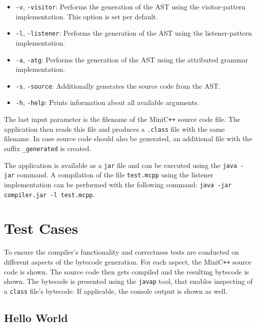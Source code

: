 \begin{itemize}
    \item \verb|-v|, \verb|-visitor|: Performs the generation of the AST using the visitor-pattern implementation. This option is set per default.
    \item \verb|-l|, \verb|-listener|: Performs the generation of the AST using the listener-pattern implementation.
    \item \verb|-a|, \verb|-atg|: Performs the generation of the AST using the attributed grammar implementation.
    \item \verb|-s|, \verb|-source|: Additionally generates the source code from the AST. 
    \item \verb|-h|, \verb|-help|: Prints information about all available arguments.
\end{itemize}

The last input parameter is the filename of the MiniC\verb|++| source code file. The application then reads this file and produces a \verb|.class| file with the same filename. In case source code should also be generated, an additional file with the suffix \verb|_generated| is created.

The application is available as a \verb|jar| file and can be executed using the \verb|java -jar| command. A compilation of the file \verb|test.mcpp| using the listener implementation can be performed with the following command: \verb|java -jar compiler.jar -l test.mcpp|.

\section{Test Cases}

To ensure the compiler's functionality and correctness tests are conducted on different aspects of the bytecode generation. For each aspect, the MiniC\verb|++| source code is shown. The source code then gets compiled and the resulting bytecode is shown. The bytecode is presented using the \verb|javap| tool, that enables inspecting of a \verb|class| file's bytecode. If applicable, the console output is shown as well.    


\subsection{Hello World}

